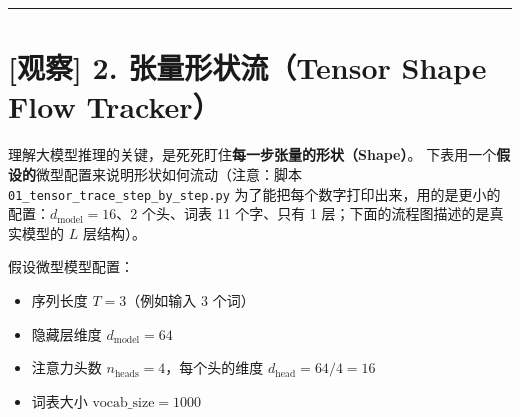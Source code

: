 \vspace{0.8em}\hrule\vspace{0.8em}

\section{[观察] 2. 张量形状流（Tensor Shape Flow Tracker）}

理解大模型推理的关键，是死死盯住\textbf{每一步张量的形状（Shape）}。
下表用一个\textbf{假设的}微型配置来说明形状如何流动（注意：脚本 \texttt{01\_tensor\_trace\_step\_by\_step.py} 为了能把每个数字打印出来，用的是更小的配置：$d_{\text{model}} = 16$、2 个头、词表 11 个字、只有 1 层；下面的流程图描述的是真实模型的 $L$ 层结构）。

假设微型模型配置：
\begin{itemize}
  \item 序列长度 $T = 3$（例如输入 3 个词）
  \item 隐藏层维度 $d_{\text{model}} = 64$
  \item 注意力头数 $n_{\text{heads}} = 4$，每个头的维度 $d_{\text{head}} = 64 / 4 = 16$
  \item 词表大小 $\text{vocab\_size} = 1000$
\end{itemize}

